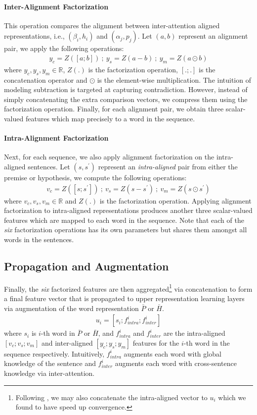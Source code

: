 \documentclass[11pt,a4paper]{article}
\begin{document}
\paragraph{Inter-Alignment Factorization}
This operation compares the alignment between inter-attention aligned representations, i.e., $(\beta_i, h_i)$ and $(\alpha_j, p_j)$. Let $(a, b)$ represent an alignment pair, we apply the following operations:
\begin{align}
y_{c}=Z([a;b]) \:;\:
y_{s}=Z(a - b) \:;\:
y_{m}=Z(a \odot b)
\end{align}
where $y_c, y_s, y_m \in \mathbb{R}$, $Z(.)$ is the factorization operation, $[.;.]$ is the concatenation operator and $\odot$ is the element-wise multiplication. The intuition of modeling subtraction is targeted at capturing contradiction. However, instead of simply concatenating the extra comparison vectors, we compress them using the factorization operation. Finally, for each alignment pair, we obtain three scalar-valued features which map precisely to a word in the sequence.
\paragraph{Intra-Alignment Factorization}
Next, for each sequence, we also apply alignment factorization on the intra-aligned sentences. Let $(s,s^\prime)$ represent an \textit{intra-aligned} pair from either the premise or hypothesis, we compute the following operations:
\begin{align}
v_{c}=Z([s;s^\prime]) \:;\:
v_{s}=Z(s - s^\prime) \:;\:
v_{m}=Z(s \odot s^\prime)
\end{align}
where $v_c, v_s, v_m \in \mathbb{R}$ and $Z(.)$ is the factorization operation. Applying alignment factorization to intra-aligned representations produces another three scalar-valued features which are mapped to each word in the sequence. Note that each of the \textit{six} factorization operations has its own parameters but shares them amongst all words in the sentences.

\subsection{Propagation and Augmentation}
Finally, the \textit{six} factorized features are then aggregated\footnote{Following \cite{DBLP:conf/emnlp/ParikhT0U16}, we may also concatenate the intra-aligned vector to $u_i$ which we found to have speed up convergence.} via concatenation to form a final feature vector that is propagated to upper representation learning layers via augmentation of the word representation $\bar{P}$ or $\bar{H}$.
\begin{align}
u_i = [s_i ; f^{i}_{intra}; f^{i}_{inter}]
\end{align}
where $s_i$ is $i$-th word in $\bar{P}$ or $\bar{H}$, and $f^{i}_{intra}$ and  $f^{i}_{inter}$ are the intra-aligned $[v_c; v_s; v_m]$  and inter-aligned $[y_c; y_s; y_m]$ features for the $i$-th word in the sequence respectively.
Intuitively, $f^i_{intra}$ augments each word with global knowledge of the sentence and $f^i_{inter}$ augments each word with cross-sentence knowledge via inter-attention.
\end{document}

